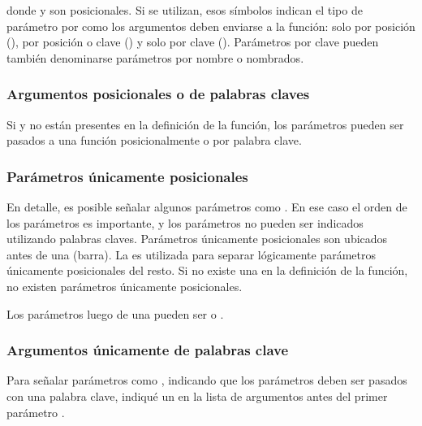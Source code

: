 \documentclass[a5paper,10pt,spanish]{sphinxmanual}
\begin{document}
\sphinxAtStartPar
donde \sphinxcode{\sphinxupquote{/}} y \sphinxcode{\sphinxupquote{*}} son posicionales. Si se utilizan, esos símbolos indican el tipo de parámetro por como los argumentos deben enviarse a la función: solo por posición (), por posición o clave () y solo por clave (). Parámetros por clave pueden también denominarse parámetros por nombre o nombrados.


\subsubsection{Argumentos posicionales o de palabras claves}
\label{\detokenize{tutorial/controlflow:positional-or-keyword-arguments}}
\sphinxAtStartPar
Si \sphinxcode{\sphinxupquote{/}} y \sphinxcode{\sphinxupquote{*}} no están presentes en la definición de la función, los parámetros pueden ser pasados a una función posicionalmente o por palabra clave.


\subsubsection{Parámetros únicamente posicionales}
\label{\detokenize{tutorial/controlflow:positional-only-parameters}}
\sphinxAtStartPar
En detalle, es posible señalar algunos parámetros como . En ese caso el orden de los parámetros es importante, y los parámetros no pueden ser indicados utilizando palabras claves. Parámetros únicamente posicionales son ubicados antes de una \sphinxcode{\sphinxupquote{/}} (barra). La \sphinxcode{\sphinxupquote{/}} es utilizada para separar lógicamente parámetros únicamente posicionales del resto. Si no existe una \sphinxcode{\sphinxupquote{/}} en la definición de la función, no existen parámetros únicamente posicionales.

\sphinxAtStartPar
Los parámetros luego de una \sphinxcode{\sphinxupquote{/}} pueden ser  o .


\subsubsection{Argumentos únicamente de palabras clave}
\label{\detokenize{tutorial/controlflow:keyword-only-arguments}}
\sphinxAtStartPar
Para señalar parámetros como , indicando que los parámetros deben ser pasados con una palabra clave, indiqué un \sphinxcode{\sphinxupquote{*}} en la lista de argumentos antes del primer parámetro .
\end{document}
